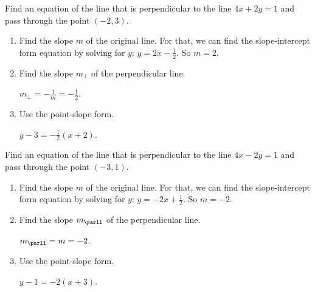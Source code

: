 \begin{tcolorbox}[colback=white,colframe=cyan, title filled=false, coltitle=cyan, enhanced, attach boxed title to top center={yshift=-3mm,yshifttext=-1mm}, fonttitle=\bfseries, boxed title style={size=small,colback=white}, before upper={\parindent15pt},
title={Find equations for perpendicular or parallel lines}]
\begin{multicols}{2}
\begin{example}
Find an equation of the line that is perpendicular to the line $4x+2y=1$ and pass through the point $(-2,3)$.
\begin{enumerate}[label={Step \arabic*.~~~}, itemsep=0em]
\item Find the slope $m$ of the original line. For that, we can find the slope-intercept form equation by solving for $y$:  $y=2x-\frac12$. So $m=2$.
\item Find the slope $m_\perp$ of the perpendicular line.\\ \centerline{$m_\perp=-\frac1m=-\frac12$.}
\item Use the point-slope form.\\\centerline{$y-3=-\frac12(x+2)$.}
\end{enumerate}

\end{example}

\columnbreak

\begin{example}
Find an equation of the line that is perpendicular to the line $4x-2y=1$ and pass through the point $(-3, 1)$.
\begin{enumerate}[label={Step \arabic*.~~~}, itemsep=0em]
\item Find the slope $m$ of the original line. For that, we can find the slope-intercept form equation by solving for $y$:  $y=-2x+\frac12$. So $m=-2$.
\item Find the slope $m_\parll$ of the perpendicular line.\\ \centerline{$m_\parll=m=-2$.}
\item Use the point-slope form.\\
\centerline{$y-1=-2(x+3)$.}
\end{enumerate}

\end{example}

\end{multicols}
\end{tcolorbox}








